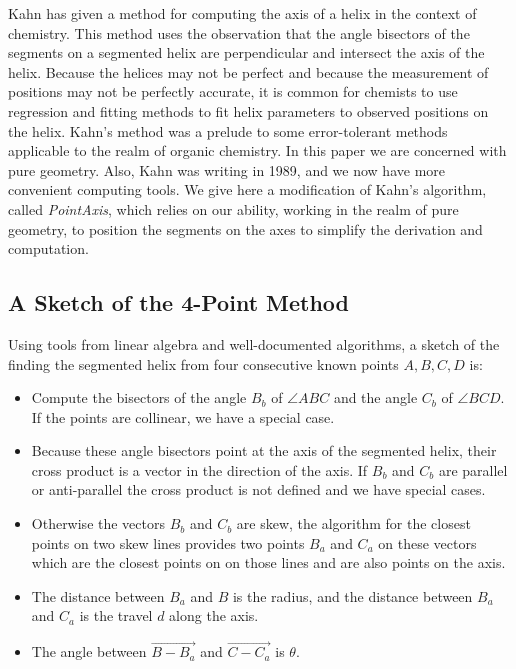 \documentclass[11pt]{article}
\begin{document}
{Kahn\cite{kahn1989defining} has given a method for computing
the axis of a helix in the context of chemistry.
This method uses the observation that the angle bisectors
of the segments on a segmented helix are perpendicular
and intersect the axis of the helix.
Because the helices may not be perfect and because the measurement of positions may not be perfectly accurate,
it is common for chemists to use regression and fitting methods to fit helix parameters to observed positions
on the helix.
Kahn's method was a prelude to some error-tolerant methods applicable to
the realm of organic chemistry.
In this paper we are concerned with pure geometry. Also, Kahn was writing in 1989,
and we now have more convenient computing tools. We give here a modification of Kahn's algorithm, called {\em PointAxis},
which relies on our ability, working in the realm of pure geometry, to position the segments on the axes
to simplify the derivation and computation.

\subsection{A Sketch of the 4-Point Method}

Using tools from linear algebra and well-documented algorithms, a sketch of the finding the segmented helix from
four consecutive known points $A,B,C,D$ is:
\begin{itemize}
\item Compute the bisectors of the angle $B_b$ of $ \angle{ABC}$ and the angle $C_b$ of $\angle{BCD}$.
  If the points are collinear, we have a special case.
\item Because these angle bisectors point at the axis of the segmented helix, their cross product is a vector
  in the direction of the axis. If $B_b$ and $C_b$ are parallel or anti-parallel the cross product is not defined
  and we have special cases.
\item  Otherwise the vectors $B_b$ and $C_b$ are skew, the algorithm for the closest points on
  two skew lines provides two points $B_a$ and $C_a$ on these vectors which
  are the closest points on on those lines and are also points on the axis.
\item The distance between $B_a$ and $B$ is the radius, and the distance between $B_a$ and $C_a$ is the travel $d$ along the axis.
  \item The angle between $\overrightarrow{B - B_a}$ and $\overrightarrow{C - C_a}$ is $\theta$.
  \end{itemize}


}
\end{document}
